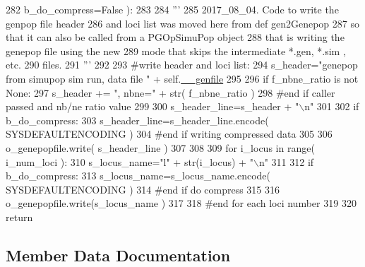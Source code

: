 \begin{DoxyCode}
282                                 b\_do\_compress=\textcolor{keyword}{False} ):
283     
284         \textcolor{stringliteral}{'''}
285 \textcolor{stringliteral}{        2017\_08\_04. Code to write the genpop file header}
286 \textcolor{stringliteral}{        and loci list was moved here from def gen2Genepop}
287 \textcolor{stringliteral}{        so that it can also be called from a PGOpSimuPop object}
288 \textcolor{stringliteral}{        that is writing the genepop file using the new}
289 \textcolor{stringliteral}{        mode that skips the intermediate *.gen, *.sim , etc.}
290 \textcolor{stringliteral}{        files.}
291 \textcolor{stringliteral}{        '''}
292 
293         \textcolor{comment}{#write header and loci list:}
294         s\_header=\textcolor{stringliteral}{"genepop from simupop sim run, data file "} + self.\hyperlink{classnegui_1_1pgoutputsimupop_1_1PGOutputSimuPop_a30fb6b94af13efad6becfbe6fddc1d95}{\_\_genfile}
295 
296         \textcolor{keywordflow}{if} f\_nbne\_ratio \textcolor{keywordflow}{is} \textcolor{keywordflow}{not} \textcolor{keywordtype}{None}:
297             s\_header += \textcolor{stringliteral}{", nbne="} + str( f\_nbne\_ratio )
298         \textcolor{comment}{#end if caller passed and nb/ne ratio value}
299 
300         s\_header\_line=s\_header + \textcolor{stringliteral}{"\(\backslash\)n"}
301 
302         \textcolor{keywordflow}{if} b\_do\_compress:
303             s\_header\_line=s\_header\_line.encode( SYSDEFAULTENCODING )
304         \textcolor{comment}{#end if writing compressed data}
305 
306         o\_genepopfile.write(  s\_header\_line )
307 
308 
309         \textcolor{keywordflow}{for} i\_locus \textcolor{keywordflow}{in} range( i\_num\_loci ):
310             s\_locus\_name=\textcolor{stringliteral}{"l"} + str(i\_locus) + \textcolor{stringliteral}{"\(\backslash\)n"} 
311 
312             \textcolor{keywordflow}{if} b\_do\_compress:
313                 s\_locus\_name=s\_locus\_name.encode( SYSDEFAULTENCODING )
314             \textcolor{comment}{#end if do compress }
315 
316             o\_genepopfile.write(s\_locus\_name )
317 
318         \textcolor{comment}{#end for each loci number}
319 
320         \textcolor{keywordflow}{return}
\end{DoxyCode}


\subsection{Member Data Documentation}
